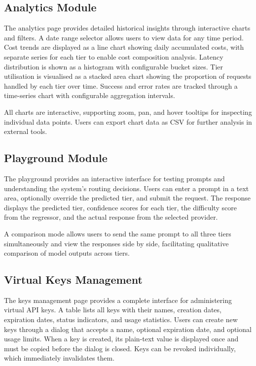 \documentclass[oneside,12pt,a4paper]{report}
\begin{document}
\subsection{Analytics Module}

The analytics page provides detailed historical insights through interactive charts and filters. A date range selector allows users to view data for any time period. Cost trends are displayed as a line chart showing daily accumulated costs, with separate series for each tier to enable cost composition analysis. Latency distribution is shown as a histogram with configurable bucket sizes. Tier utilisation is visualised as a stacked area chart showing the proportion of requests handled by each tier over time. Success and error rates are tracked through a time-series chart with configurable aggregation intervals.

All charts are interactive, supporting zoom, pan, and hover tooltips for inspecting individual data points. Users can export chart data as CSV for further analysis in external tools.

\subsection{Playground Module}

The playground provides an interactive interface for testing prompts and understanding the system's routing decisions. Users can enter a prompt in a text area, optionally override the predicted tier, and submit the request. The response displays the predicted tier, confidence scores for each tier, the difficulty score from the regressor, and the actual response from the selected provider.

A comparison mode allows users to send the same prompt to all three tiers simultaneously and view the responses side by side, facilitating qualitative comparison of model outputs across tiers.

\subsection{Virtual Keys Management}

The keys management page provides a complete interface for administering virtual API keys. A table lists all keys with their names, creation dates, expiration dates, status indicators, and usage statistics. Users can create new keys through a dialog that accepts a name, optional expiration date, and optional usage limits. When a key is created, its plain-text value is displayed once and must be copied before the dialog is closed. Keys can be revoked individually, which immediately invalidates them.
\end{document}
